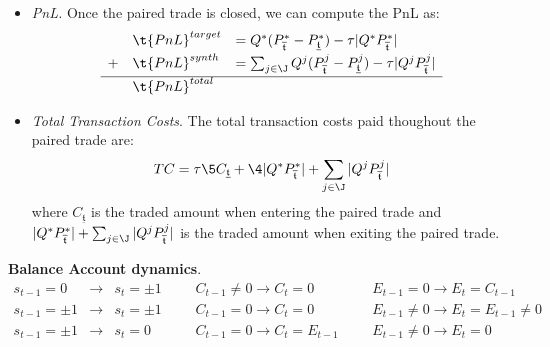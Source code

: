 \begin{itemize}
\item \textit{PnL.} Once the paired trade is closed, we can compute the PnL as: 
$$
\begin{array}{lll}
&\t{PnL}^{target} 
&= Q^*(P_{\overline{\mathfrak{t}}}^*-P_{\underline{\mathfrak{t}}}^*) - \tau | Q^* P_{\overline{\mathfrak{t}}}^* |
\\[0.3em]
+ &\t{PnL}^{synth} 
&= \sum_{j\in\J} Q^j(P_{\overline{\mathfrak{t}}}^j-P_{\underline{\mathfrak{t}}}^j)
- \tau |Q^j P_{\overline{\mathfrak{t}}}^j|
\\[0.3em]\hline 
&\t{PnL}^{total} 
\end{array}
$$

\item \textit{Total Transaction Costs}. The total transaction costs paid thoughout the paired trade are:
$$
TC = 
\tau 
\5{
C_{\underline{\mathfrak{t}}} + 
\4{
| Q^* P_{\overline{\mathfrak{t}}}^* | + 
\sum_{j\in\J}  |Q^j P_{\overline{\mathfrak{t}}}^j|
}
}
$$
where $C_{\underline{\mathfrak{t}}}$ is the traded amount when entering the paired trade and $| Q^* P_{\overline{\mathfrak{t}}}^* | + 
\sum_{j\in\J}  |Q^j P_{\overline{\mathfrak{t}}}^j|$ is the traded amount when exiting the paired trade.

\end{itemize}




\noindent \textbf{Balance Account dynamics}. 
$$\begin{array}{llllllllll}
s_{t-1}=0  &\to &s_t=\pm 1 &&& C_{t-1}\neq 0\to C_t=0 &&& E_{t-1} = 0\to E_t=C_{t-1}
\\
s_{t-1}=\pm 1 &\to &s_t= \pm 1 &&& C_{t-1}=0\to C_t = 0 &&& E_{t-1} \neq 0 \to E_{t} = E_{t-1} \neq 0
\\
s_{t-1}=\pm 1 &\to &s_t=0 &&& C_{t-1}=0 \to C_t = E_{t-1} &&& E_{t-1} \neq 0 \to E_{t} = 0
\end{array}$$

